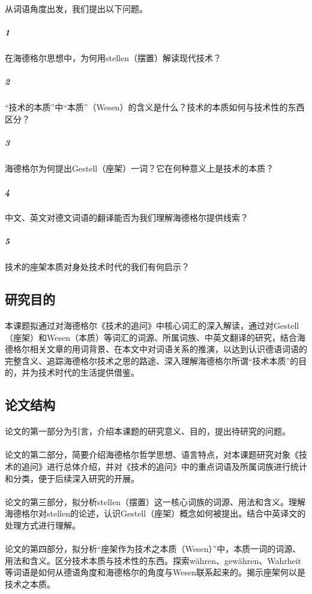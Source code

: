 \documentclass{article}
\begin{document}
		\paragraph{}
     从词语角度出发，我们提出以下问题。
        
		\subparagraph{1} 
            在海德格尔思想中，为何用stellen（摆置）解读现代技术？
		\subparagraph{2} 
           “技术的本质”中“本质”（Wesen）的含义是什么？技术的本质如何与技术性的东西区分？
		\subparagraph{3}海德格尔为何提出Gestell（座架）一词？它在何种意义上是技术的本质？
		\subparagraph{4}中文、英文对德文词语的翻译能否为我们理解海德格尔提供线索？
		\subparagraph{5}技术的座架本质对身处技术时代的我们有何启示？
	\subsection{研究目的}
		\paragraph{}
        本课题拟通过对海德格尔《技术的追问》中核心词汇的深入解读，通过对Gestell（座架）和Wesen（本质）等词汇的词源、所属词族、中英文翻译的研究，结合海德格尔相关文章的用词背景、在本文中对词语关系的推演，以达到认识德语词语的完整含义、追踪海德格尔技术之思的路途、深入理解海德格尔所谓“技术本质”的目的，并为技术时代的生活提供借鉴。
	\subsection{论文结构}
		\paragraph{}
        论文的第一部分为引言，介绍本课题的研究意义、目的，提出待研究的问题。
		\paragraph{}
        论文的第二部分，简要介绍海德格尔哲学思想、语言特点，对本课题研究对象《技术的追问》进行总体介绍，并对《技术的追问》中的重点词语及所属词族进行统计和分类，便于后续深入研究的开展。
        \paragraph{}
        论文的第三部分，拟分析stellen（摆置）这一核心词族的词源、用法和含义。理解海德格尔对stellen的论述，认识Gestell（座架）概念如何被提出。结合中英译文的处理方式进行理解。
        \paragraph{}
        论文的第四部分，拟分析“座架作为技术之本质（Wesen）”中，本质一词的词源、用法和含义。区分技术本质与技术性的东西。探索währen、gewähren、Wahrheit等词语是如何从德语角度和海德格尔的角度与Wesen联系起来的。揭示座架何以是技术之本质。
\end{document}
